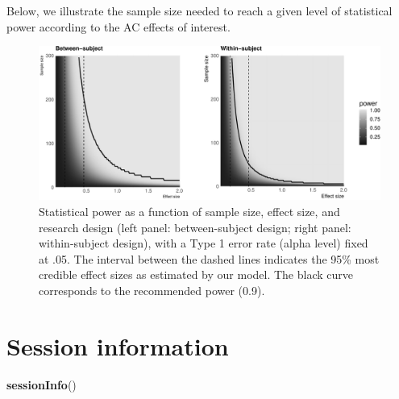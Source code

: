 \documentclass[floatsintext,doc]{apa6}
\newenvironment{Shaded}{\begin{snugshade}}{\end{snugshade}}
\newcommand{\KeywordTok}[1]{\textcolor[rgb]{0.13,0.29,0.53}{\textbf{#1}}}
\newcommand{\NormalTok}[1]{#1}
\begin{document}
Below, we illustrate the sample size needed to reach a given level of statistical power according to the AC effects of interest.

\begin{figure}
\centering
\includegraphics{supplementary_materials_files/figure-latex/power-1.pdf}
\caption{\label{fig:power}Statistical power as a function of sample size, effect size, and research design (left panel: between-subject design; right panel: within-subject design), with a Type 1 error rate (alpha level) fixed at .05. The interval between the dashed lines indicates the 95\% most credible effect sizes as estimated by our model. The black curve corresponds to the recommended power (0.9).}
\end{figure}

\newpage

\hypertarget{session-information}{%
\section{Session information}\label{session-information}}

\begin{Shaded}
\begin{Highlighting}[]
\KeywordTok{sessionInfo}\NormalTok{()}
\end{Highlighting}
\end{Shaded}
\end{document}
